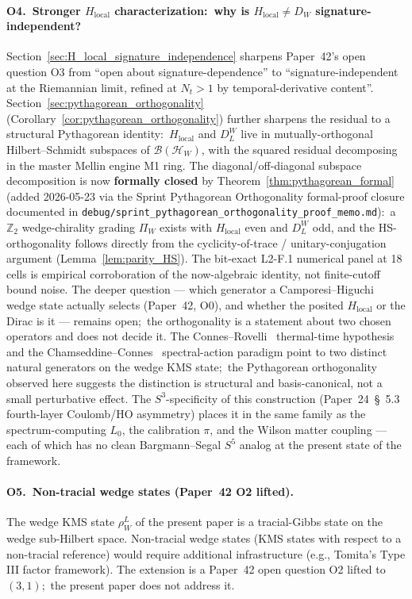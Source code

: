 \documentclass[11pt,a4paper]{article}
\theoremstyle{plain}
\theoremstyle{definition}
\newcommand{\Nt}{N_t}
\newcommand{\Hilb}{\mathcal{H}}
\newcommand{\DL}{D_{L}}
\begin{document}
\paragraph{O4.\ Stronger $H_{\mathrm{local}}$ characterization:\ why is
$H_{\mathrm{local}} \ne D_W$ signature-independent?}
Section~\ref{sec:H_local_signature_independence} sharpens Paper~42's
open question O3 from ``open about signature-dependence'' to
``signature-independent at the Riemannian limit, refined at $\Nt > 1$
by temporal-derivative content''.
Section~\ref{sec:pythagorean_orthogonality}
(Corollary~\ref{cor:pythagorean_orthogonality}) further sharpens
the residual to a structural Pythagorean identity:\
$H_{\mathrm{local}}$ and $\DL^W$ live in mutually-orthogonal
Hilbert--Schmidt subspaces of $\mathcal{B}(\Hilb_W)$, with the
squared residual decomposing in the master Mellin engine M1 ring.
The diagonal/off-diagonal subspace decomposition is now
\textbf{formally closed} by Theorem~\ref{thm:pythagorean_formal}
(added 2026-05-23 via the Sprint Pythagorean Orthogonality
formal-proof closure documented in
\texttt{debug/sprint\_pythagorean\_orthogonality\_proof\_memo.md}):\
a $\mathbb{Z}_{2}$ wedge-chirality grading $\Pi_{W}$ exists with
$H_{\mathrm{local}}$ even and $\DL^{W}$ odd, and the
HS-orthogonality follows directly from the cyclicity-of-trace /
unitary-conjugation argument
(Lemma~\ref{lem:parity_HS}). The bit-exact L2-F.1 numerical
panel at 18 cells is empirical corroboration of the now-algebraic
identity, not finite-cutoff bound noise.
The deeper question --- which generator a Camporesi--Higuchi wedge
state actually selects (Paper~42, O0), and whether the posited
$H_{\mathrm{local}}$ or the Dirac is it --- remains open;\ the
orthogonality is a statement about two chosen operators and does not
decide it. The Connes--Rovelli~\cite{connes_rovelli1994} thermal-time
hypothesis and the Chamseddine--Connes~\cite{chamseddine_connes2010}
spectral-action paradigm point to two distinct natural generators on
the wedge KMS state;\ the Pythagorean orthogonality observed here
suggests the distinction is structural and basis-canonical, not a
small perturbative effect. The $S^3$-specificity of this
construction (Paper~24~\S~5.3~\cite{paper24} fourth-layer
Coulomb/HO asymmetry) places it in the same family as the
spectrum-computing $L_0$, the calibration $\pi$, and the Wilson
matter coupling --- each of which has no clean Bargmann--Segal
$S^5$ analog at the present state of the framework.

\paragraph{O5.\ Non-tracial wedge states (Paper~42 O2 lifted).}
The wedge KMS state $\rho_W^L$ of the present paper is a tracial-Gibbs
state on the wedge sub-Hilbert space. Non-tracial wedge states (KMS
states with respect to a non-tracial reference) would require additional
infrastructure (e.g., Tomita's Type III factor framework). The
extension is a Paper~42 open question O2 lifted to $(3, 1)$;\
the present paper does not address it.
\end{document}
